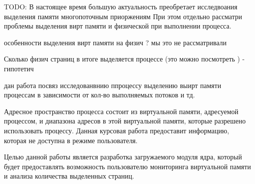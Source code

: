 \Introduction

TODO:
В настоящее время большую актуальность преобретает исследвоания выделения памяти многопоточным приоржениям 
При этом отдельно рассматри проблемы выделения вирт памяти и физической при выполнении процесса.

особенности выделения вирт памяти на физич ? мы это не рассматривали 

Сколько физич страниц в итоге выделяется процессе (это можно посмотреть ) - гипотетич

дан работа посвяз исследованвнию ппроцессу выделению выирт памяти процессам в зависимости от кол-во выполняемых потоков и тд.



Адресное пространство процесса состоит из виртуальной памяти, адресуемой
процессом, и диапазона адресов в этой виртуальной памяти, которые
разрешено использовать процессу. Данная курсовая работа предоставит 
информацию, которая не доступна в режиме пользователя.

Целью данной работы является разработка загружаемого модуля ядра,
который будет предоставлять возможность пользователю мониторинга
виртуальной памяти и анализа количества выделенных страниц.


